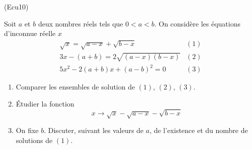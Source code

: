 \begin{tiny}(Ecu10)\end{tiny}
Soit $a$ et $b$ deux nombres r{\'e}els tels que $0<a<b$. On consid{\`e}re les équations d'inconnue r{\'e}elle $x$
\begin{eqnarray*}
\sqrt{x} = \sqrt{a-x}+\sqrt{b-x}  &(1)\\
3x-(a+b) = 2\sqrt{(a-x)(b-x)}  &(2)\\
5x^2 -2(a+b)x+(a-b)^2 = 0 &(3)
\end{eqnarray*}

\begin{enumerate}
\item Comparer les ensembles de solution de $(1)$, $(2)$, $(3)$.

\item  {\'E}tudier la fonction
\begin{displaymath}
x\rightarrow \sqrt{x}-\sqrt{a-x}-\sqrt{b-x}  
\end{displaymath}

\item  On fixe $b$. Discuter, suivant les valeurs de $a$, de l'existence et du nombre de solutions de $(1)$.
\end{enumerate}